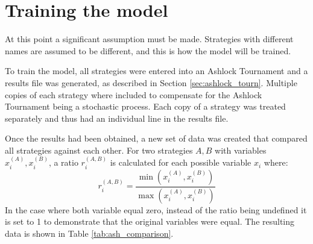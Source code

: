 \section{Training the model}\label{sec:training_model}

At this point a significant assumption must be made.
Strategies with different names are assumed to be different, and this is how the model will be trained.

To train the model, all strategies were entered into an Ashlock Tournament and a results file was generated, as described in Section \ref{sec:ashlock_tourn}.
Multiple copies of each strategy where included to compensate for the Ashlock Tournament being a stochastic process.
Each copy of a strategy was treated separately and thus had an individual line in the results file.

Once the results had been obtained, a new set of data was created that compared all strategies against each other.
For two strategies $A, B$ with variables $x_i^{(A)}, x_i^{(B)}$, a ratio $r_i^{(A, B)}$ is calculated for each possible variable $x_i$ where:
$$
r_i^{(A, B)} = \frac{\min(x_i^{(A)}, x_i^{(B)})}{\max(x_i^{(A)}, x_i^{(B)})}
$$
In the case where both variable equal zero, instead of the ratio being undefined it is set to 1 to demonstrate that the original variables were equal.
The resulting data is shown in Table \ref{tab:ash_comparison}.

